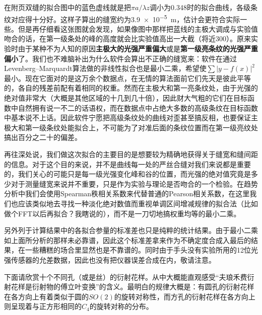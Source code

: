 \documentclass[UTF8]{ctexart}
\begin{document}
在附页双缝的拟合图中的蓝色虚线就是把$\pi a/\lambda z$调小为0.348时的拟合曲线，各级条纹对应得十分好。这样子算出的缝宽约为\SI{3.9e-5}{\m}，估计会更符合实际一些。但是再仔细看这张图就会发现，如果像图中那样把蓝线的主极大调成与实验值吻合的话，在第一级条处的峰的高度就会比实验值高出一大截（将近300）。原来实验时由于某种不为人知的原因\textbf{主极大的光强严重偏大}或是\textbf{第一级亮条纹的光强严重偏小}了。我们也不难脑补出为什么软件会算出不正确的缝宽来：软件在通过Levenberg–Marquardt算法做的非线性拟合也是最小二乘，希望使$\sum\lvert y-f(x)\rvert^2$最小。现在它面对的是这万余个数据点，在无情的算法面前它们先天是彼此平等的，各自的残差前配有着相同的权重。然而在主极大和第一亮条纹处，由于光强的绝对值非常大（大概是其他区域的十几到几十倍），因此财大气粗的它们在目标函数中自然拥有说一不二的话语权，而在数据点中占绝大多数的高级条纹在目标函数中基本说不上话。因此软件宁愿把高级条纹处的曲线对歪甚至搞反相，也要保证主极大和第一级条纹处能拟合上，不可能为了对准后面的条纹位置而在第一级亮纹处搞出百分之二十的偏差。

再往深处说，我们做这次拟合的主要目的是想要较为精确地获得关于缝宽和缝间距的信息。对于这个目的来说，并不是曲线每一处的严丝合缝对我们来说都是重要的，我们关心的可能只是每一级光强变化峰和谷的位置，而光强的绝对值究竟是多少对于测量缝宽来说并不重要，只是作为实验与理论是否吻合的一个检验。在趋势分析中我们会使用Spearman秩相关系数来代替普通的Pearson相关系数，在这里我们也应该类似地去寻找一种淡化绝对数值而重视单调区间增减规律的拟合法（比如做个FFT以后再拟合？我瞎说的），而不是一刀切地搞权重均等的最小二乘。

另外列于计算结果中的各拟合参量的标准差也只是纯粹的统计结果。由于最小二乘如上面所分析的那样未必靠谱，因此这个标准差拿来作为不确定度合成入最后的结果，在一些糟糕的场合里显然也是不靠谱的。同时由于手头没有实验所用的12位光强传感器的允差数据，因此也没有把仪器误差合成在内，敬请注意。

下面请欣赏十个不同孔（或是丝）的衍射花样。从中大概能直观感受“夫琅禾费衍射花样是衍射物的傅立叶变换”的含义。最明白的规律大概是：有圆孔的衍射花样在各方向上有着类似于圆的$SO(2)$的旋转对称性，而方孔的衍射花样在各方向上则呈现着与正方形相同的$C_4$的旋转对称的分布。
\end{document}
